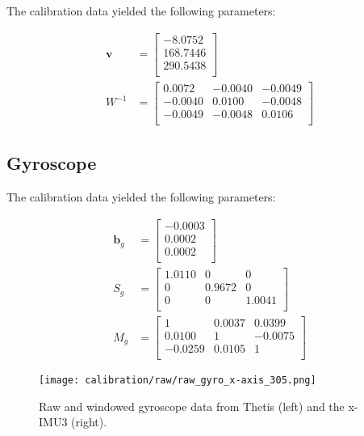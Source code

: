 The calibration data yielded the following parameters:

\begin{align*}
    \pmb{v} &= 
    \begin{bmatrix}
        -8.0752 \\
        168.7446 \\
        290.5438 \\
    \end{bmatrix} \\
    W^{-1} &= 
    \begin{bmatrix}
        0.0072 & -0.0040 & -0.0049 \\
        -0.0040 & 0.0100 & -0.0048 \\
        -0.0049 & -0.0048 & 0.0106 \\
    \end{bmatrix}
\end{align*}

\subsection{Gyroscope}

The calibration data yielded the following parameters:

\begin{align*}
    \pmb{b}_g &= 
    \begin{bmatrix}
        -0.0003 \\
        0.0002 \\
        0.0002 \\
    \end{bmatrix} \\
    S_g &= 
    \begin{bmatrix}
        1.0110 & 0      & 0 \\
        0      & 0.9672 & 0 \\
        0      & 0      & 1.0041 \\
    \end{bmatrix} \\
    M_g &= 
    \begin{bmatrix}
        1       & 0.0037 & 0.0399 \\
        0.0100  & 1      & -0.0075 \\
        -0.0259 & 0.0105 & 1 \\
    \end{bmatrix}
\end{align*}

\begin{figure}[h!]
    \centering
    \texttt{[image: calibration/raw/raw\_gyro\_x-axis\_305.png]}
    \caption[Raw and windowed gyroscope data]{Raw and windowed gyroscope data from Thetis (left) and the x-IMU3 (right).}
\end{figure}

